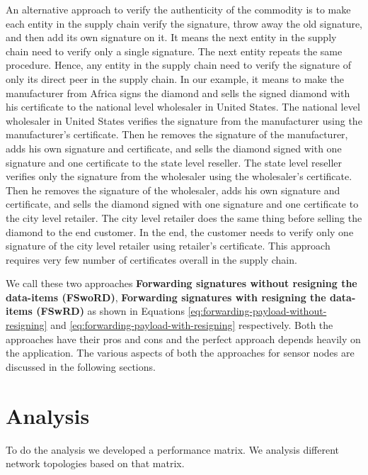 	An alternative approach to verify the authenticity of the commodity is to make each entity in the supply chain verify the signature, throw away the old signature, and then add its own signature on it. 
	It means the next entity in the supply chain need to verify only a single signature.
	The next entity repeats the same procedure.
	Hence, any entity in the supply chain need to verify the signature of only its direct peer in the supply chain. 
	In our example, it means to make the manufacturer from Africa signs the diamond and sells the signed diamond with his certificate to the national level wholesaler in United States.
	The national level wholesaler in United States verifies the signature from the manufacturer using the manufacturer's certificate.
	Then he removes the signature of the manufacturer, adds his own signature and certificate, and sells the diamond signed with one signature and one certificate to the state level reseller.
	The state level reseller verifies only the signature from the wholesaler using the wholesaler's certificate.
	Then he removes the signature of the wholesaler, adds his own signature and certificate, and sells the diamond signed with one signature and one certificate to the city level retailer.
	The city level retailer does the same thing before selling the diamond to the end customer.
	In the end, the customer needs to verify only one signature of the city level retailer using retailer's certificate.
	This approach requires very few number of certificates overall in the supply chain.

	We call these two approaches \textbf{Forwarding signatures without resigning the data-items (FSwoRD)}, \textbf{Forwarding signatures with resigning the data-items (FSwRD)} as shown in Equations \ref{eq:forwarding-payload-without-resigning} and \ref{eq:forwarding-payload-with-resigning} respectively.
	Both the approaches have their pros and cons and the perfect approach depends heavily on the application.
	The various aspects of both the approaches for sensor nodes are discussed in the following sections.

\section{Analysis}
	To do the analysis we developed a performance matrix. 
	We analysis different network topologies based on that matrix.

